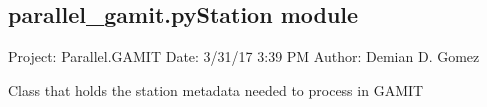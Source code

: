 \documentclass[letterpaper,10pt,english]{sphinxmanual}
\begin{document}
\subsection{parallel\_gamit.pyStation module}
\label{\detokenize{parallel_gamit:module-parallel_gamit.pyStation}}\label{\detokenize{parallel_gamit:parallel-gamit-pystation-module}}
\sphinxAtStartPar
Project: Parallel.GAMIT
Date: 3/31/17 3:39 PM
Author: Demian D. Gomez

\sphinxAtStartPar
Class that holds the station metadata needed to process in GAMIT
\end{document}
